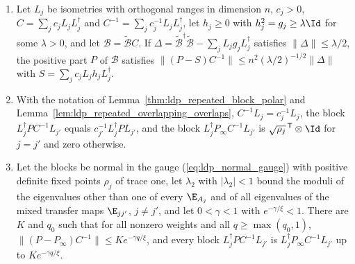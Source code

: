 \begin{lemma}
    \label{lem:ldp_relative_positive_part}
    \leanok
    \begin{enumerate}
        \item Let $L_j$ be isometries with orthogonal ranges in dimension $n$, $c_j>0$,
              $C=\sum_jc_jL_jL_j^\dagger$ and $C^{-1}=\sum_jc_j^{-1}L_jL_j^\dagger$, let
              $h_j\geq0$ with $h_j^2=g_j\geq\lambda\Id$ for some $\lambda>0$, and let
              $\mathcal B=\widetilde{\mathcal B}C$. If
              $\Delta=\widetilde{\mathcal B}^\dagger\widetilde{\mathcal B}
                  -\sum_jL_jg_jL_j^\dagger$ satisfies $\lVert\Delta\rVert\leq\lambda/2$, the
              positive part $P$ of $\mathcal B$ satisfies
              $\lVert(P-S)C^{-1}\rVert\leq n^2(\lambda/2)^{-1/2}\lVert\Delta\rVert$ with
              $S=\sum_jc_jL_jh_jL_j^\dagger$.
        \item With the notation of Lemma~\ref{thm:ldp_repeated_block_polar} and
              Lemma~\ref{lem:ldp_repeated_overlapping_overlaps}, $C^{-1}L_j=c_j^{-1}L_j$, the
              block $L_j^\dagger PC^{-1}L_{j'}$ equals $c_{j'}^{-1}L_j^\dagger PL_{j'}$, and the
              block $L_j^\dagger P_\infty C^{-1}L_{j'}$ is
              $\sqrt{\rho_j}^{\,\mathsf T}\otimes\Id$ for $j=j'$ and zero otherwise.
        \item Let the blocks be normal in the gauge (\ref{eq:ldp_normal_gauge}) with positive
              definite fixed points $\rho_j$ of trace one, let $\lambda_2$ with
              $\lvert\lambda_2\rvert<1$ bound the moduli of the eigenvalues other than one of
              every $\E_{A_j}$ and of all eigenvalues of the mixed transfer maps
              $\E_{jj'}$, $j\neq j'$, and let $0<\gamma<1$ with $e^{-\gamma/\xi}<1$. There are
              $K$ and $q_0$ such that for all nonzero weights and all $q\geq\max(q_0,1)$,
              $\lVert(P-P_\infty)C^{-1}\rVert\leq Ke^{-\gamma q/\xi}$, and every block
              $L_j^\dagger PC^{-1}L_{j'}$ is $L_j^\dagger P_\infty C^{-1}L_{j'}$ up to
              $Ke^{-\gamma q/\xi}$.
    \end{enumerate}
\end{lemma}
